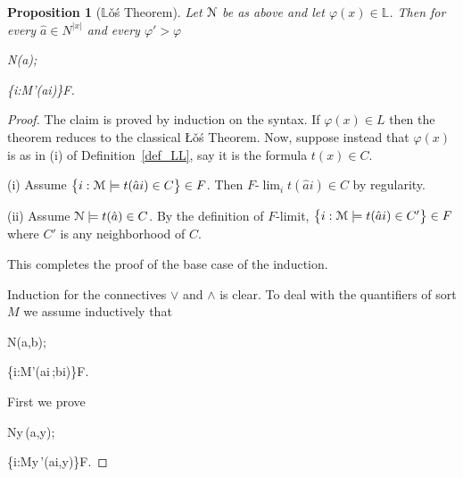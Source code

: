 \documentclass[11pt,oneside]{amsart}
\theoremstyle{plain}
\newtheorem{proposition}[theorem]{Proposition}
\theoremstyle{remark}
\begin{document}
\begin{proposition}[$\mathds{L}$\v{o}\'s Theorem]\label{thm_Los}
  Let ${\EuScript N}$ be as above and let $\varphi(x)\in\mathds{L}$.
  Then for every $\hat a\in N^{|x|}$ and every $\varphi'>\varphi$
  
  {\Rightarrow}
  {{\EuScript N}\models\varphi(\hat a)};

  {\Rightarrow}
  {\big\{i:{\EuScript M}\models\varphi'(\hat ai)\big\}\in F}.

\end{proposition}
\begin{proof}  
  The claim is proved by induction on the syntax.
  If $\varphi(x)\in L$ then the theorem reduces to the classical \L\v{o}\'s Theorem. 
  Now, suppose instead that $\varphi(x)$ is as in (i) of Definition~\ref{def_LL}, say it is the formula $t(x)\in C$.
  
  (\textsf{i})
  Assume $\big\{ i:{\EuScript M}\models t(\hat ai)\in C\big\}\in F$.
  Then $F\mbox{-}\lim_it(\hat ai)\in C$ by regularity.
  
  (\textsf{ii}) Assume ${\EuScript N}\models t(\hat a)\in C$.
  By the definition of $F$-limit, $\big\{ i:{\EuScript M}\models t(\hat ai)\in C'\big\}\in F$ where $C'$  is any neighborhood of $C$.

  This completes the proof of the base case of the induction.

  Induction for the connectives $\vee$ and $\wedge$ is clear.
  To deal with the quantifiers of sort $M$ we assume inductively that 

  {\Rightarrow}
  {{\EuScript N}\models\varphi(\hat a,\hat b)};

  {\Rightarrow}
  {\big\{i:{\EuScript M}\models\varphi'(\hat ai\,;\hat bi)\big\}\in F}.
  
  First we prove
  
  {\Rightarrow}
  {{\EuScript N}\models\forall y\,\varphi(\hat a,y)};

  {\Rightarrow}
  {\big\{i:{\EuScript M}\models\forall y\,\varphi'(\hat ai,y)\big\}\in F}.


\end{proof}
\end{document}
